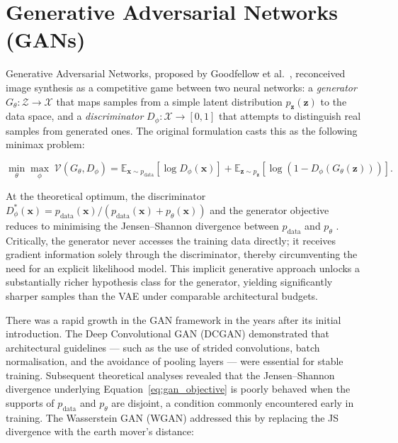 
\section{Generative Adversarial Networks (GANs)}
\label{sec:gans}

Generative Adversarial Networks, proposed by Goodfellow et al.\
\cite{goodfellow2014generative}, reconceived image synthesis as a competitive
game between two neural networks: a \emph{generator} $G_\theta : \mathcal{Z}
\to \mathcal{X}$ that maps samples from a simple latent distribution
$p_\mathbf{z}(\mathbf{z})$ to the data space, and a \emph{discriminator}
$D_\phi : \mathcal{X} \to [0, 1]$ that attempts to distinguish real samples
from generated ones. The original formulation casts this as the following
minimax problem:

\begin{equation}
    \min_\theta \max_\phi \; \mathcal{V}(G_\theta, D_\phi) =
    \mathbb{E}_{\mathbf{x} \sim p_{\text{data}}}[\log D_\phi(\mathbf{x})]
    + \mathbb{E}_{\mathbf{z} \sim p_\mathbf{z}}
    [\log(1 - D_\phi(G_\theta(\mathbf{z})))].
    \label{eq:gan_objective}
\end{equation}

At the theoretical optimum, the discriminator $D_\phi^*(\mathbf{x}) =
p_{\text{data}}(\mathbf{x}) / (p_{\text{data}}(\mathbf{x}) + p_\theta(\mathbf{x}))$
and the generator objective reduces to minimising the Jensen--Shannon divergence
between $p_{\text{data}}$ and $p_\theta$ \cite{goodfellow2014generative}.
Critically, the generator never accesses the training data directly; it
receives gradient information solely through the discriminator, thereby
circumventing the need for an explicit likelihood model. This implicit
generative approach unlocks a substantially richer hypothesis class for the
generator, yielding significantly sharper samples than the VAE under
comparable architectural budgets.

There was a rapid growth in the GAN framework in the years after its initial introduction. The Deep Convolutional GAN (DCGAN)
demonstrated that architectural guidelines — such as the use of strided
convolutions, batch normalisation, and the avoidance of pooling layers — were
essential for stable training. Subsequent theoretical analyses revealed that
the Jensen--Shannon divergence underlying Equation~\ref{eq:gan_objective}
is poorly behaved when the supports of $p_{\text{data}}$ and $p_\theta$ are
disjoint, a condition commonly encountered early in training. The Wasserstein
GAN (WGAN) addressed this by replacing the
JS divergence with the earth mover's distance:

